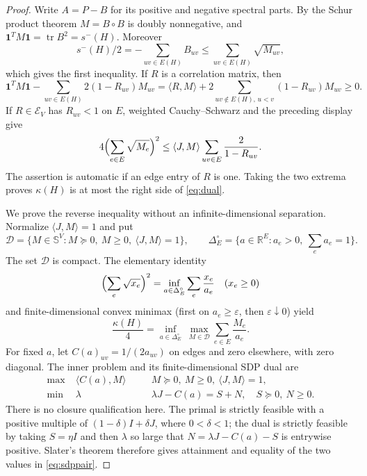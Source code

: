 \documentclass[11pt]{article}
\theoremstyle{remark}
\newcommand{\smn}{s^-}
\newcommand{\kap}{\kappa}
\newcommand{\one}{\mathbf 1}
\begin{document}
\begin{proof}
Write $A=P-B$ for its positive and negative spectral parts.  By the Schur
product theorem $M=B\circ B$ is doubly nonnegative, and
$\one^TM\one=\operatorname{tr}B^2=\smn(H)$.  Moreover
\[
 \smn(H)/2=-\sum_{uv\in E(H)}B_{uv}
 \le\sum_{uv\in E(H)}\sqrt{M_{uv}},
\]
which gives the first inequality.  If $R$ is a correlation matrix, then
\[
 \one^TM\one-\sum_{uv\in E(H)}2(1-R_{uv})M_{uv}
 =\langle R,M\rangle+
 2\sum_{uv\notin E(H),\,u<v}(1-R_{uv})M_{uv}\ge0.
\]
If $R\in\mathcal E_V$ has $R_{uv}<1$ on $E$, weighted
Cauchy--Schwarz and the preceding display give
\[
 4\Bigl(\sum_{e\in E}\sqrt{M_e}\Bigr)^2
 \le \langle J,M\rangle
       \sum_{uv\in E}\frac{2}{1-R_{uv}}.
\]
The assertion is automatic if an edge entry of $R$ is one.  Taking the two
extrema proves $\kap(H)$ is at most the right side of \eqref{eq:dual}.

We prove the reverse inequality without an infinite-dimensional separation.
Normalize $\langle J,M\rangle=1$ and put
\[
 \mathcal D=\{M\in\mathbb S^V:M\succeq0,\ M\ge0,
                    \ \langle J,M\rangle=1\},\qquad
 \Delta_E^\circ=\{a\in\mathbb R^E:a_e>0,\ \sum_ea_e=1\}.
\]
The set $\mathcal D$ is compact.  The elementary identity
\[
 \Bigl(\sum_e\sqrt{x_e}\Bigr)^2
   =\inf_{a\in\Delta_E^\circ}\sum_e\frac{x_e}{a_e}
 \quad(x_e\ge0)
\]
and finite-dimensional convex minimax (first on $a_e\ge\varepsilon$, then
$\varepsilon\downarrow0$) yield
\begin{equation}\label{eq:minimax}
 \frac{\kap(H)}4=
 \inf_{a\in\Delta_E^\circ}\ \max_{M\in\mathcal D}
       \sum_{e\in E}\frac{M_e}{a_e}.
\end{equation}
For fixed $a$, let $C(a)_{uv}=1/(2a_{uv})$ on edges and zero elsewhere,
with zero diagonal.  The inner problem and its finite-dimensional SDP dual are
\begin{equation}\label{eq:sdppair}
 \begin{aligned}
  \max\;&\langle C(a),M\rangle
   &\quad& M\succeq0,\ M\ge0,\ \langle J,M\rangle=1,\\
  \min\;&\lambda
   && \lambda J-C(a)=S+N,\quad S\succeq0,\ N\ge0.
 \end{aligned}
\end{equation}
There is no closure qualification here.  The primal is strictly feasible with
a positive multiple of $(1-\delta)I+\delta J$, where $0<\delta<1$; the dual is
strictly feasible by taking $S=\eta I$ and then $\lambda$ so large that
$N=\lambda J-C(a)-S$ is entrywise positive.  Slater's theorem therefore gives
attainment and equality of the two values in \eqref{eq:sdppair}.


\end{proof}
\end{document}
